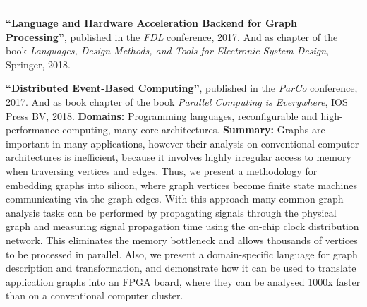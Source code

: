 \begin{cventries}
\rule{8cm}{0.5pt}\vspace{-3mm}
\cventry
{}
{}
{}
{}
{
\begin{cvitems}
\item{\textbf{``Language and Hardware Acceleration Backend for Graph 
Processing''}, published in the \textit{FDL} conference, 2017. And as chapter 
of the book \textit{Languages, Design Methods, and Tools for Electronic System 
Design}, Springer, 2018.}
\item{\textbf{``Distributed Event-Based Computing''}, published in the 
\textit{ParCo} conference, 2017. And as book chapter of the book 
\textit{Parallel Computing is Everywhere}, IOS Press BV, 2018.\newline}
\textbf{Domains:} Programming languages, reconfigurable and high-performance 
computing, many-core architectures.\newline
\textbf{Summary:} Graphs are important in many applications, however their 
analysis on conventional computer architectures is inefficient, because it 
involves highly irregular access to memory when traversing vertices and edges. 
Thus, we present a methodology for embedding graphs into silicon, where graph 
vertices become finite state machines communicating via the graph edges. With 
this approach many common graph analysis tasks can be performed by propagating 
signals through the physical graph and measuring signal propagation time using 
the on-chip clock distribution network. This eliminates the memory bottleneck 
and allows thousands of vertices to be processed in parallel. Also, we present 
a domain-specific language for graph description and transformation, and 
demonstrate how it can be used to translate application graphs into an FPGA 
board, where they can be analysed 1000x faster than on a conventional computer 
cluster.
\end{cvitems}
}


\end{cventries}
